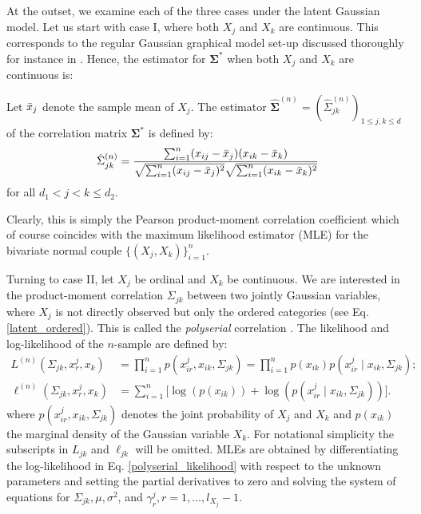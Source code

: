 At the outset, we examine each of the three cases under the latent Gaussian model. Let us start with case I, where both $X_j$ and $X_k$ are continuous. This corresponds to the regular Gaussian graphical model set-up discussed thoroughly for instance in \citet{Ravikumar11}. Hence, the estimator for $\boldsymbol\Sigma^*$ when both $X_j$ and $X_k$ are continuous is:
\begin{definition}\label{def1}
    Let $\Bar{x}_j$ denote the sample mean of $X_j$. The estimator $\hat{\boldsymbol{\Sigma}}^{(n)} = (\hat{\Sigma}_{jk}^{(n)})_{1\leq j, k\leq d}$ of the correlation matrix $\boldsymbol{\Sigma}^*$ is defined by:
    \begin{equation}
            \hat{\Sigma}_{jk}^{(n)} = \frac{\sum_{i=1}^n(x_{ij}- \Bar{x}_j)(x_{ik}- \Bar{x}_k)}{\sqrt{\sum_{i=1}^n(x_{ij}- \Bar{x}_j)^2} \sqrt{\sum_{i=1}^n(x_{ik}- \Bar{x}_k)^2}}  
    \end{equation}
    for all $d_1 < j < k \leq d_2$. 
\end{definition}
Clearly, this is simply the Pearson product-moment correlation coefficient which of course coincides with the maximum likelihood estimator (MLE) for the bivariate normal couple $\{(X_j,X_k)\}_{i=1}^n$.

Turning to case II, let $X_j$ be ordinal and $X_k$ be continuous. We are interested in the product-moment correlation $\Sigma_{jk}$ between two jointly Gaussian variables, where $X_j$ is not directly observed but only the ordered categories (see Eq. \eqref{latent_ordered}). This is called the \textit{polyserial} correlation \citep{Olsson82}. The likelihood and log-likelihood of the $n$-sample are defined by:
\begin{equation}\label{polyserial_likelihood}
    \begin{split}
        L^{(n)}(\Sigma_{jk}, x^j_r,x_k) &= \prod_{i=1}^n p(x^j_{ir},x_{ik}, \Sigma_{jk}) = \prod_{i=1}^n p(x_{ik})p(x^j_{ir} \mid x_{ik}, \Sigma_{jk}); \\
        \ell^{(n)}(\Sigma_{jk}, x^j_r,x_k) &= \sum_{i=1}^n \big[\log(p(x_{ik})) + \log(p(x^j_{ir} \mid x_{ik}, \Sigma_{jk}))\big].
    \end{split}
\end{equation}
where $p(x^j_{ir},x_{ik}, \Sigma_{jk})$ denotes the joint probability of  $X_j$ and $X_k$ and $p(x_{ik})$ the marginal density of the Gaussian variable $X_k$. For notational simplicity the subscripts in $L_{jk}$ and $\ell_{jk}$ will be omitted. MLEs are obtained by differentiating the log-likelihood in Eq.  \eqref{polyserial_likelihood} with respect to the unknown parameters and setting the partial derivatives to zero and solving the system of equations for $\Sigma_{jk}, \mu, \sigma^2$, and $\gamma^j_r, r = 1, \dots, l_{X_j}-1$.  

